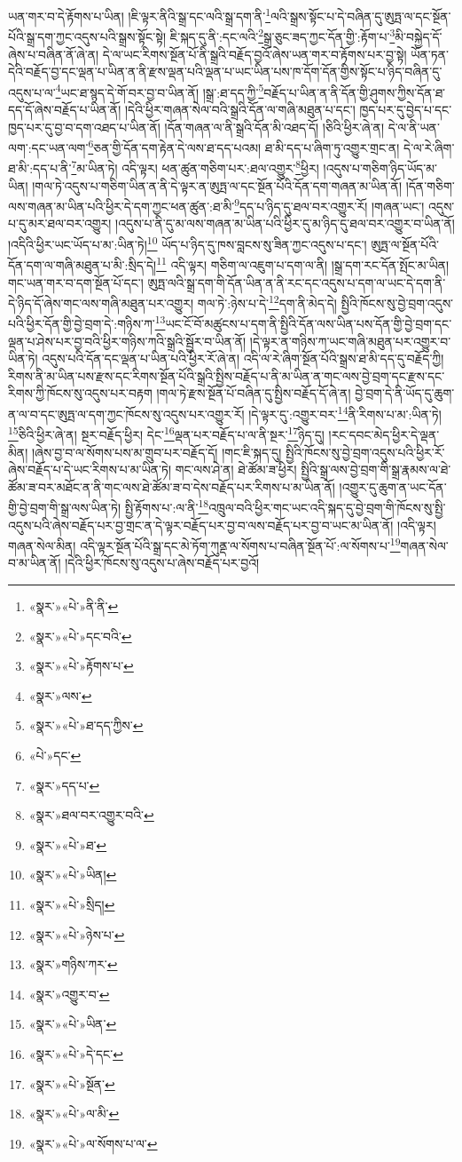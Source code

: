 ཡན་གར་བ་དེ་རྟོགས་པ་ཡིན། །ཇི་ལྟར་ནིའི་སྒྲ་དང་ལའི་སྒྲ་དག་ནི་\footnote{«སྣར་»«པེ་»ནི་ནི་}ལའི་སྒྲས་སྟོང་པ་དེ་བཞིན་དུ་ཨུཏྤ་ལ་དང་སྔོན་པོའི་སྒྲ་དག་ཀྱང་འདུས་པའི་སྒྲས་སྟོང་སྟེ། ཇི་སྐད་དུ་ནི་:དང་ལའི་\footnote{«སྣར་»«པེ་»དང་བའི་}སྒྲ་ཅུང་ཟད་ཀྱང་དོན་གྱི་:རྟོག་པ་\footnote{«སྣར་»«པེ་»རྟོགས་པ་}མི་བསྐྱེད་དོ་ཞེས་པ་བཞིན་ནོ་ཞེ་ན། དེ་ལ་ཡང་རིགས་སྔོན་པོ་ནི་སྒྲའི་བརྗོད་བྱའོ་ཞེས་ཡན་གར་བ་རྟོགས་པར་བྱ་སྟེ། ཡོན་ཏན་དེའི་བརྗོད་བྱ་དང་ལྡན་པ་ཡིན་ན་ནི་རྫས་ལྡན་པའི་ལྡན་པ་ཡང་ཡིན་པས་ཁ་དོག་དོན་གྱིས་སྟོང་པ་ཉིད་བཞིན་དུ་འདུས་པ་ལ་\footnote{«སྣར་»ལས་}ཡང་ཐ་སྙད་དེ་གོ་བར་བྱ་བ་ཡིན་ནོ། །སྒྲ་:ཐ་དད་ཀྱི་\footnote{«སྣར་»«པེ་»ཐ་དད་ཀྱིས་}བརྗོད་པ་ཡིན་ན་ནི་དོན་གྱི་ཤུགས་ཀྱིས་དོན་ཐ་དད་དོ་ཞེས་བརྗོད་པ་ཡིན་ནོ། །དེའི་ཕྱིར་གཞན་སེལ་བའི་སྒྲའི་དོན་ལ་གཞི་མཐུན་པ་དང་། ཁྱད་པར་དུ་བྱེད་པ་དང་ཁྱད་པར་དུ་བྱ་བ་དག་འཐད་པ་ཡིན་ནོ། །དོན་གཞན་ལ་ནི་སྒྲའི་དོན་མི་འཐད་དོ། །ཅིའི་ཕྱིར་ཞེ་ན། དེ་ལ་ནི་ཡན་ལག་:དང་ཡན་ལག་\footnote{«པེ་»དང་}ཅན་གྱི་དོན་དག་རྟེན་དེ་ལས་ཐ་དད་པའམ། ཐ་མི་དད་པ་ཞིག་ཏུ་འགྱུར་གྲང་ན། དེ་ལ་རེ་ཞིག་ཐ་མི་:དད་པ་ནི་\footnote{«སྣར་»དད་པ་}མ་ཡིན་ཏེ། འདི་ལྟར། ཕན་ཚུན་གཅིག་པར་:ཐལ་འགྱུར་\footnote{«སྣར་»ཐལ་བར་འགྱུར་བའི་}ཕྱིར། །འདུས་པ་གཅིག་ཉིད་ཡོད་མ་ཡིན། །གལ་ཏེ་འདུས་པ་གཅིག་ཡིན་ན་ནི་དེ་ལྟར་ན་ཨུཏྤ་ལ་དང་སྔོན་པོའི་དོན་དག་གཞན་མ་ཡིན་ནོ། །དོན་གཅིག་ལས་གཞན་མ་ཡིན་པའི་ཕྱིར་དེ་དག་ཀྱང་ཕན་ཚུན་:ཐ་མི་\footnote{«སྣར་»«པེ་»ཐ་}དད་པ་ཉིད་དུ་ཐལ་བར་འགྱུར་རོ། །གཞན་ཡང་། འདུས་པ་དུ་མར་ཐལ་བར་འགྱུར། །འདུས་པ་ནི་དུ་མ་ལས་གཞན་མ་ཡིན་པའི་ཕྱིར་དུ་མ་ཉིད་དུ་ཐལ་བར་འགྱུར་བ་ཡིན་ནོ། །འདིའི་ཕྱིར་ཡང་ཡོད་པ་མ་:ཡིན་ཏེ།\footnote{«སྣར་»«པེ་»ཡིན།} ཡོད་པ་ཉིད་དུ་ཁས་བླངས་སུ་ཟིན་ཀྱང་འདུས་པ་དང་། ཨུཏྤ་ལ་སྔོན་པོའི་དོན་དག་ལ་གཞི་མཐུན་པ་མི་:སྲིད་དེ།\footnote{«སྣར་»«པེ་»སྲིད།} འདི་ལྟར། གཅིག་ལ་འཇུག་པ་དག་ལ་ནི། །སྒྲ་དག་རང་དོན་སྤོང་མ་ཡིན། གང་ཡན་གར་བ་དག་སྔོན་པོ་དང་། ཨུཏྤ་ལའི་སྒྲ་དག་གི་དོན་ཡིན་ན་ནི་རང་དང་འདུས་པ་དག་ལ་ཡང་དེ་དག་ནི་དེ་ཉིད་དོ་ཞེས་གང་ལས་གཞི་མཐུན་པར་འགྱུར། གལ་ཏེ་:ཉེས་པ་དེ་\footnote{«སྣར་»«པེ་»ཉེས་པ་}དག་ནི་མེད་དེ། སྤྱིའི་ཁོངས་སུ་བྱེ་བྲག་འདུས་པའི་ཕྱིར་དོན་གྱི་བྱེ་བྲག་དེ་:གཉིས་ཀ་\footnote{«སྣར་»གཉིས་ཀར་}ཡང་ངོ་བོ་མཚུངས་པ་དག་ནི་སྤྱིའི་དོན་ལས་ཡིན་པས་དོན་གྱི་བྱེ་བྲག་དང་ལྡན་པ་ཤེས་པར་བྱ་བའི་ཕྱིར་གཉིས་ཀའི་སྒྲའི་སྦྱོར་བ་ཡིན་ནོ། །དེ་ལྟར་ན་གཉིས་ཀ་ཡང་གཞི་མཐུན་པར་འགྱུར་བ་ཡིན་ཏེ། འདུས་པའི་དོན་དང་ལྡན་པ་ཡིན་པའི་ཕྱིར་རོ་ཞེ་ན། འདི་ལ་རེ་ཞིག་སྔོན་པོའི་སྒྲས་ཐ་མི་དད་དུ་བརྗོད་ཀྱི། རིགས་ནི་མ་ཡིན་པས་རྫས་དང་རིགས་སྔོན་པོའི་སྒྲའི་སྤྱིས་བརྗོད་པ་ནི་མ་ཡིན་ན་གང་ལས་བྱེ་བྲག་དང་རྫས་དང་རིགས་ཀྱི་ཁོངས་སུ་འདུས་པར་བརྟག །གལ་ཏེ་རྫས་སྔོན་པོ་བཞིན་དུ་སྤྱིས་བརྗོད་དོ་ཞེ་ན། བྱེ་བྲག་དེ་ནི་ཡོད་དུ་ཆུག་ན་ལ་བ་དང་ཨུཏྤ་ལ་དག་ཀྱང་ཁོངས་སུ་འདུས་པར་འགྱུར་རོ། །དེ་ལྟར་དུ་:འགྱུར་བར་\footnote{«སྣར་»འགྱུར་བ་}ནི་རིགས་པ་མ་:ཡིན་ཏེ། \footnote{«སྣར་»«པེ་»ཡིན་}ཅིའི་ཕྱིར་ཞེ་ན། སྔར་བརྗོད་ཕྱིར། དེང་\footnote{«སྣར་»«པེ་»དེ་དང་}ལྡན་པར་བརྗོད་པ་ལ་ནི་སྔར་\footnote{«སྣར་»«པེ་»སྔོན་}ཉིད་དུ། །རང་དབང་མེད་ཕྱིར་དེ་ལྡན་མིན། །ཞེས་བྱ་བ་ལ་སོགས་པས་མ་གྲུབ་པར་བརྗོད་དོ། །གང་ཇི་སྐད་དུ། སྤྱིའི་ཁོངས་སུ་བྱེ་བྲག་འདུས་པའི་ཕྱིར་རོ་ཞེས་བརྗོད་པ་དེ་ཡང་རིགས་པ་མ་ཡིན་ཏེ། གང་ལས་ཤེ་ན། ཐེ་ཚོམ་ཟ་ཕྱིར། སྤྱིའི་སྒྲ་ལས་བྱེ་བྲག་གི་སྒྲ་རྣམས་ལ་ཐེ་ཚོམ་ཟ་བར་མཐོང་ན་ནི་གང་ལས་ཐེ་ཚོམ་ཟ་བ་དེས་བརྗོད་པར་རིགས་པ་མ་ཡིན་ནོ། །འགྱུར་དུ་ཆུག་ན་ཡང་དོན་གྱི་བྱེ་བྲག་གི་སྒྲ་ལས་ཡིན་ཏེ། སྤྱི་རྟོགས་པ་:ལ་ནི་\footnote{«སྣར་»«པེ་»ལ་མི་}འཁྲུལ་བའི་ཕྱིར་གང་ཡང་འདི་སྐད་དུ་བྱེ་བྲག་གི་ཁོངས་སུ་སྤྱི་འདུས་པའི་ཞེས་བརྗོད་པར་བྱ་གྲང་ན་དེ་ལྟར་བརྗོད་པར་བྱ་བ་ལས་བརྗོད་པར་བྱ་བ་ཡང་མ་ཡིན་ནོ། །འདི་ལྟར། གཞན་སེལ་མིན། འདི་ལྟར་སྔོན་པོའི་སྒྲ་དང་མེ་ཏོག་ཀུནྡ་ལ་སོགས་པ་བཞིན་སྔོན་པོ་:ལ་སོགས་པ་\footnote{«སྣར་»«པེ་»ལ་སོགས་པ་ལ་}གཞན་སེལ་བ་མ་ཡིན་ནོ། །དེའི་ཕྱིར་ཁོངས་སུ་འདུས་པ་ཞེས་བརྗོད་པར་བྱའོ། 